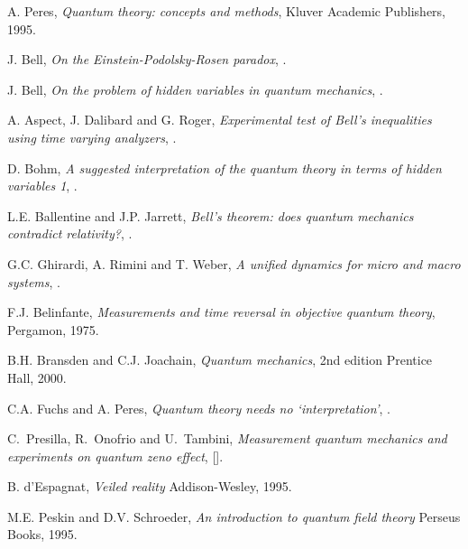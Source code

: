 \documentclass[published]{JHEP3}
\begin{document}
\begin{thebibliography}{99}

A. Peres, \emph{Quantum theory: concepts and methods}, Kluver Academic
Publishers, 1995.



J. Bell, \emph{On the Einstein-Podolsky-Rosen paradox},
.



J. Bell, \emph{On the problem of hidden variables in quantum
  mechanics}, .


A. Aspect, J. Dalibard and G. Roger, \emph{Experimental test of Bell's
inequalities using time varying analyzers}, .


D. Bohm, \emph{A suggested interpretation of the quantum theory in
terms of hidden variables 1}, .

L.E. Ballentine and J.P. Jarrett, \emph{Bell's theorem: does quantum
mechanics contradict relativity?}, .


G.C. Ghirardi, A. Rimini and T. Weber, \emph{A unified dynamics for
micro and macro systems}, \prd{34}{1986}{470}.


F.J. Belinfante, \emph{Measurements and time reversal in objective
quantum theory}, Pergamon, 1975.


B.H. Bransden and C.J. Joachain, \emph{Quantum mechanics}, 2nd edition
Prentice Hall, 2000.

C.A. Fuchs and A. Peres, \emph{Quantum theory needs no
`interpretation'}, .


C.~Presilla, R.~Onofrio and U.~Tambini, \emph{Measurement quantum
  mechanics and experiments on quantum zeno effect},
   [].



B. d'Espagnat, \emph{Veiled reality} Addison-Wesley, 1995.



M.E. Peskin and D.V. Schroeder, \emph{An introduction to quantum field
theory} Perseus Books, 1995.



\end{thebibliography}
\end{document}
